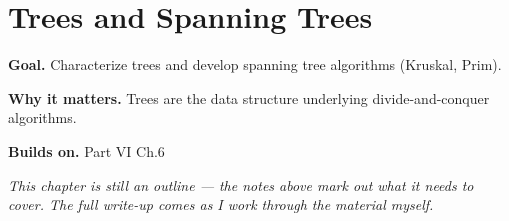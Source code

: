 \chapter{Trees and Spanning Trees}
\label{ch:06-combinatorics-and-graph-theory-07}

\begin{chapterintro}
\textbf{Goal.} Characterize trees and develop spanning tree algorithms (Kruskal, Prim).

\textbf{Why it matters.} Trees are the data structure underlying divide-and-conquer algorithms.

\textbf{Builds on.} Part VI Ch.6
\end{chapterintro}

\textit{This chapter is still an outline --- the notes above mark out what it needs to cover. The full write-up comes as I work through the material myself.}
